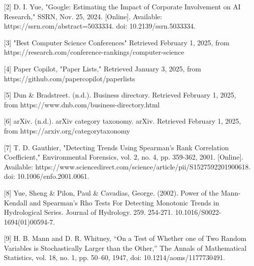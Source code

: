 \documentclass{article}
\begin{document}
[2] D. I. Yue, "Google: Estimating the Impact of Corporate Involvement on AI Research," SSRN, Nov. 25, 2024. [Online]. Available: https://ssrn.com/abstract=5033334. doi: 10.2139/ssrn.5033334.

[3] "Best Computer Science Conferences" Retrieved February 1, 2025, from https://research.com/conference-rankings/computer-science

[4] Paper Copilot, "Paper Lists," Retrieved January 3, 2025, from https://github.com/papercopilot/paperlists

[5] Dun \& Bradstreet. (n.d.). Business directory. Retrieved February 1, 2025, from https://www.dnb.com/business-directory.html

[6] arXiv. (n.d.). arXiv category taxonomy. arXiv. Retrieved February 1, 2025, from https://arxiv.org/category\textunderscore taxonomy

[7] T. D. Gauthier, "Detecting Trends Using Spearman's Rank Correlation Coefficient," Environmental Forensics, vol. 2, no. 4, pp. 359-362, 2001. [Online]. Available: https://www.sciencedirect.com/science/article/pii/S1527592201900618. doi: 10.1006/enfo.2001.0061.

[8] Yue, Sheng \& Pilon, Paul \& Cavadias, George. (2002). Power of the Mann-Kendall and Spearman's Rho Tests For Detecting Monotonic Trends in Hydrological Series. Journal of Hydrology. 259. 254-271. 10.1016/S0022-1694(01)00594-7. 

[9] H. B. Mann and D. R. Whitney, “On a Test of Whether one of Two Random Variables is Stochastically Larger than the Other,” The Annals of Mathematical Statistics, vol. 18, no. 1, pp. 50–60, 1947, doi: 10.1214/aoms/1177730491.
\end{document}
